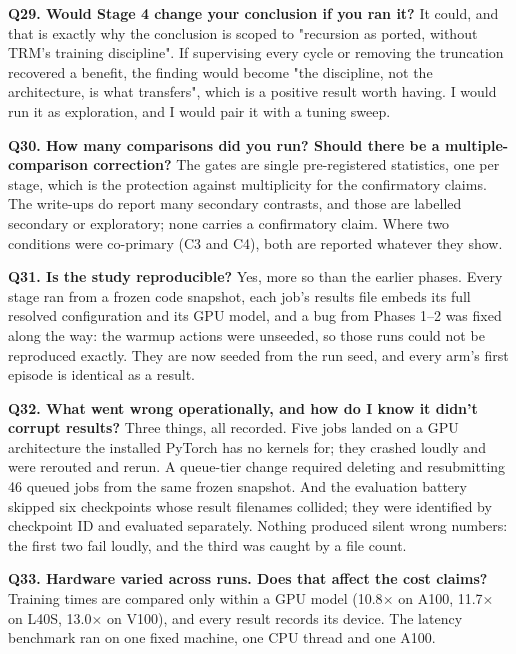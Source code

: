 \documentclass[11pt]{article}
\begin{document}
\textbf{Q29. Would Stage 4 change your conclusion if you ran it?} It could, and that is exactly why the conclusion is scoped to "recursion as ported, without TRM's training discipline". If supervising every cycle or removing the truncation recovered a benefit, the finding would become "the discipline, not the architecture, is what transfers", which is a positive result worth having. I would run it as exploration, and I would pair it with a tuning sweep.



\textbf{Q30. How many comparisons did you run? Should there be a multiple-comparison correction?} The gates are single pre-registered statistics, one per stage, which is the protection against multiplicity for the confirmatory claims. The write-ups do report many secondary contrasts, and those are labelled secondary or exploratory; none carries a confirmatory claim. Where two conditions were co-primary (C3 and C4), both are reported whatever they show.



\textbf{Q31. Is the study reproducible?} Yes, more so than the earlier phases. Every stage ran from a frozen code snapshot, each job's results file embeds its full resolved configuration and its GPU model, and a bug from Phases 1--2 was fixed along the way: the warmup actions were unseeded, so those runs could not be reproduced exactly. They are now seeded from the run seed, and every arm's first episode is identical as a result.



\textbf{Q32. What went wrong operationally, and how do I know it didn't corrupt results?} Three things, all recorded. Five jobs landed on a GPU architecture the installed PyTorch has no kernels for; they crashed loudly and were rerouted and rerun. A queue-tier change required deleting and resubmitting 46 queued jobs from the same frozen snapshot. And the evaluation battery skipped six checkpoints whose result filenames collided; they were identified by checkpoint ID and evaluated separately. Nothing produced silent wrong numbers: the first two fail loudly, and the third was caught by a file count.



\textbf{Q33. Hardware varied across runs. Does that affect the cost claims?} Training times are compared only within a GPU model (10.8$\times$ on A100, 11.7$\times$ on L40S, 13.0$\times$ on V100), and every result records its device. The latency benchmark ran on one fixed machine, one CPU thread and one A100.
\end{document}

